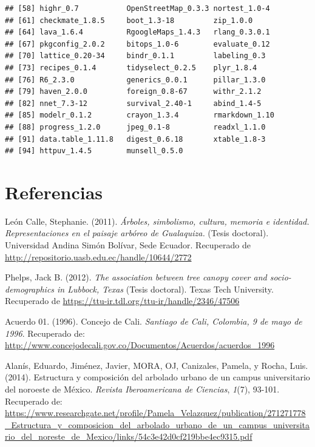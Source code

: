 \documentclass[12pt,a4paper,openany]{book}
\theoremstyle{definition}
\theoremstyle{definition}
\theoremstyle{definition}
\theoremstyle{remark}
\begin{document}
\begin{verbatim}
## [58] highr_0.7           OpenStreetMap_0.3.3 nortest_1.0-4      
## [61] checkmate_1.8.5     boot_1.3-18         zip_1.0.0          
## [64] lava_1.6.4          RgoogleMaps_1.4.3   rlang_0.3.0.1      
## [67] pkgconfig_2.0.2     bitops_1.0-6        evaluate_0.12      
## [70] lattice_0.20-34     bindr_0.1.1         labeling_0.3       
## [73] recipes_0.1.4       tidyselect_0.2.5    plyr_1.8.4         
## [76] R6_2.3.0            generics_0.0.1      pillar_1.3.0       
## [79] haven_2.0.0         foreign_0.8-67      withr_2.1.2        
## [82] nnet_7.3-12         survival_2.40-1     abind_1.4-5        
## [85] modelr_0.1.2        crayon_1.3.4        rmarkdown_1.10     
## [88] progress_1.2.0      jpeg_0.1-8          readxl_1.1.0       
## [91] data.table_1.11.8   digest_0.6.18       xtable_1.8-3       
## [94] httpuv_1.4.5        munsell_0.5.0
\end{verbatim}

\chapter*{Referencias}\label{referencias}

\hypertarget{refs}{}
\hypertarget{ref-leon_calle_arboles_2011}{}
León Calle, Stephanie. (2011). \emph{Árboles, simbolismo, cultura,
memoria e identidad. Representaciones en el paisaje arbóreo de
Gualaquiza.} (Tesis doctoral). Universidad Andina Simón Bolívar, Sede
Ecuador. Recuperado de
\url{http://repositorio.uasb.edu.ec/handle/10644/2772}

\hypertarget{ref-phelps_association_2012}{}
Phelps, Jack B. (2012). \emph{The association between tree canopy cover
and socio-demographics in Lubbock, Texas} (Tesis doctoral). Texas Tech
University. Recuperado de
\url{https://ttu-ir.tdl.org/ttu-ir/handle/2346/47506}

\hypertarget{ref-cc_acuerdo01_1996}{}
Acuerdo 01. (1996). Concejo de Cali. \emph{Santiago de Cali, Colombia, 9
de mayo de 1996}. Recuperado de:
\url{http://www.concejodecali.gov.co/Documentos/Acuerdos/acuerdos_1996}

\hypertarget{ref-alanis_estructura_2014}{}
Alanís, Eduardo, Jiménez, Javier, MORA, OJ, Canizales, Pamela, y Rocha,
Luis. (2014). Estructura y composición del arbolado urbano de un campus
universitario del noroeste de México. \emph{Revista Iberoamericana de
Ciencias}, \emph{1}(7), 93-101. Recuperado de:
\url{https://www.researchgate.net/profile/Pamela_Velazquez/publication/271271778_Estructura_y_composicion_del_arbolado_urbano_de_un_campus_universitario_del_noreste_de_Mexico/links/54c3e42d0cf219bbe4ec9315.pdf}
\end{document}
